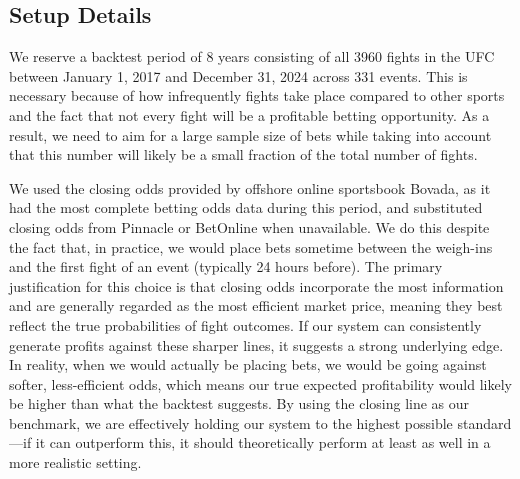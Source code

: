 \documentclass[12pt,twoside]{report}
\begin{document}
\subsection{Setup Details}

We reserve a backtest period of 8 years consisting of all 3960 fights in the UFC between January 1, 2017 and December 31, 2024 across 331 events. This is necessary because of how infrequently fights take place compared to other sports and the fact that not every fight will be a profitable betting opportunity. As a result, we need to aim for a large sample size of bets while taking into account that this number will likely be a small fraction of the total number of fights.

We used the closing odds provided by offshore online sportsbook Bovada, as it had the most complete betting odds data during this period, and substituted closing odds from Pinnacle or BetOnline when unavailable. We do this despite the fact that, in practice, we would place bets sometime between the weigh-ins and the first fight of an event (typically 24 hours before). The primary justification for this choice is that closing odds incorporate the most information and are generally regarded as the most efficient market price, meaning they best reflect the true probabilities of fight outcomes. If our system can consistently generate profits against these sharper lines, it suggests a strong underlying edge. In reality, when we would actually be placing bets, we would be going against softer, less-efficient odds, which means our true expected profitability would likely be higher than what the backtest suggests. By using the closing line as our benchmark, we are effectively holding our system to the highest possible standard---if it can outperform this, it should theoretically perform at least as well in a more realistic setting.
\end{document}
